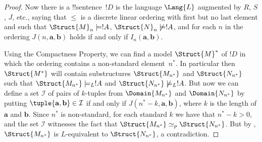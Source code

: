 \documentclass[../../include/open-logic-section]{subfiles}
\begin{document}
\begin{proof}
Now there is a !!{sentence}~$!D$ is the language $\Lang{L}$ augmented
by $R$, $S$, $J$, etc., saying that $\le$ is a discrete linear ordering
with first but no last element and such that $\Struct{M}_n \models
!A$, $\Struct{N}_n \not\models !A$, and for each $n$ in the
ordering $J(n, \mathbf{a}, \mathbf{b})$ holds if and only if
$I_n(\mathbf{a}, \mathbf{b})$.

Using the Compactness Property, we can find a model $\Struct{M}^*$ of
$!D$ in which the ordering contains a non-standard element~$n^*$. In
particular then $\Struct{M^*}$ will contain substructures
$\Struct{M_{n^*}}$ and $\Struct{N_{n^*}}$ such that $\Struct{M_{n^*}}
\models_L !A$ and $\Struct{N_{n^*}} \not\models_L !A$. But now we can
define a set $\mathcal{I}$ of pairs of $k$-tuples from
$\Domain{M_{n^*}}$ and $\Domain{N_{n^*}}$ by putting
$\tuple{\mathbf{a}, \mathbf{b}} \in \mathcal{I}$ if and only if
$J(n^*-k, \mathbf{a}, \mathbf{b})$, where $k$ is the length of
$\mathbf{a}$ and $\mathbf{b}$. Since $n^*$ is non-standard, for each
standard $k$ we have that $n^* - k >0$, and the set $\mathcal{I}$
witnesses the fact that $\Struct{M_{n^*}} \simeq_p
\Struct{N_{n^*}}$. But by ,
$\Struct{M_{n^*}}$ is $L$-equivalent to $\Struct{N_{n^*}}$, a
contradiction.
\end{proof}
\end{document}
